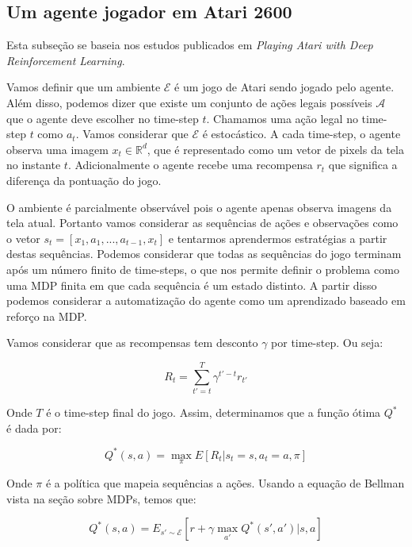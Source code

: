 \documentclass[a4paper,10pt]{article}
\theoremstyle{plain}
\begin{document}
\subsection{Um agente jogador em Atari 2600}

Esta subseção se baseia nos estudos publicados em \textit{Playing Atari with Deep Reinforcement
Learning}\cite{dqn}.

Vamos definir que um ambiente $\mathcal{E}$ é um jogo de Atari sendo jogado pelo agente. Além
disso, podemos dizer que existe um conjunto de ações legais possíveis $\mathcal{A}$ que o agente
deve escolher no time-step $t$. Chamamos uma ação legal no time-step $t$ como $a_t$. Vamos
considerar que $\mathcal{E}$ é estocástico. A cada time-step, o agente observa uma imagem $x_t \in
\mathbb{R}^d$, que é representado como um vetor de pixels da tela no instante $t$. Adicionalmente
o agente recebe uma recompensa $r_t$ que significa a diferença da pontuação do jogo.

O ambiente é parcialmente observável pois o agente apenas observa imagens da tela atual. Portanto
vamos considerar as sequências de ações e observações como o vetor $s_t=[x_1,a_1,...,a_{t-1},x_t]$
e tentarmos aprendermos estratégias a partir destas sequências. Podemos considerar que todas as
sequências do jogo terminam após um número finito de time-steps, o que nos permite definir o
problema como uma MDP finita em que cada sequência é um estado distinto. A partir disso podemos
considerar a automatização do agente como um aprendizado baseado em reforço na MDP.

Vamos considerar que as recompensas tem desconto $\gamma$ por time-step. Ou seja:

\begin{equation*}
  R_t = \sum_{t'=t}^T \gamma^{t'-t}r_{t'}
\end{equation*}

Onde $T$ é o time-step final do jogo. Assim, determinamos que a função ótima $Q^*$ é dada por:

\begin{equation*}
  Q^*(s,a) = \max_\pi E[R_t|s_t=s, a_t=a, \pi]
\end{equation*}

Onde $\pi$ é a política que mapeia sequências a ações. Usando a equação de Bellman vista na seção
sobre MDPs, temos que:

\begin{equation*}
  Q^*(s,a) = E_{s' \sim \mathcal{E}} \left[r+\gamma\max_{a'}Q^*(s',a')|s,a\right]
\end{equation*}
\end{document}
